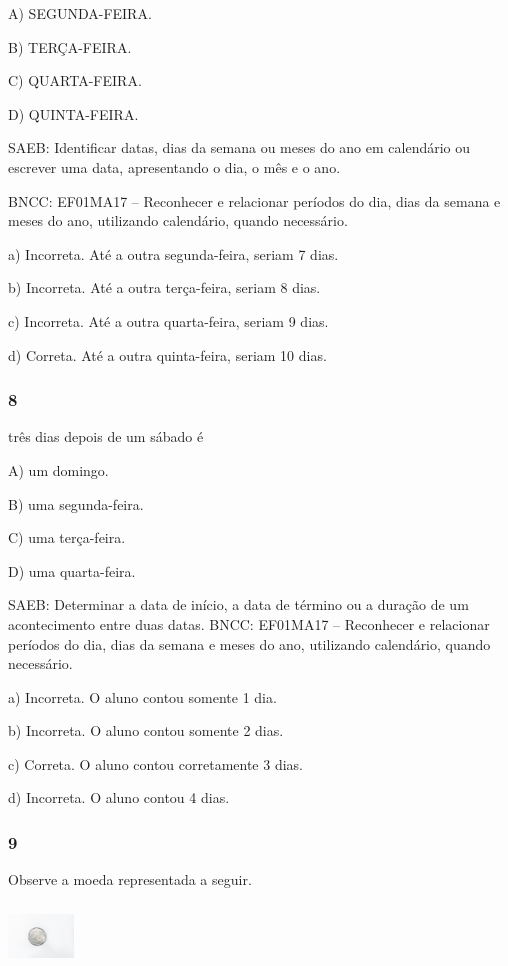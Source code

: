 \begin{itemize}
\begin{itemize}
A) SEGUNDA-FEIRA.

B) TERÇA-FEIRA.

C) QUARTA-FEIRA.

D) QUINTA-FEIRA.

SAEB: Identificar datas, dias da semana ou meses do ano em
calendário ou escrever uma data, apresentando o dia, o mês e o ano.

BNCC: EF01MA17 -- Reconhecer e relacionar períodos do dia, dias da semana
e meses do ano, utilizando calendário, quando necessário.

a) Incorreta. Até a outra segunda-feira, seriam 7 dias.

b) Incorreta. Até a outra terça-feira, seriam 8 dias.

c) Incorreta. Até a outra quarta-feira, seriam 9 dias.

d) Correta. Até a outra quinta-feira, seriam 10 dias.

\subsubsection{8}\label{section-124}

três dias depois de um sábado é

A) um domingo.

B) uma segunda-feira.

C) uma terça-feira.

D) uma quarta-feira.

SAEB: Determinar a data de início, a data de término ou a
duração de um acontecimento entre duas datas.
BNCC: EF01MA17 -- Reconhecer e relacionar períodos do dia, dias da semana
e meses do ano, utilizando calendário, quando necessário.

a) Incorreta. O aluno contou somente 1 dia.

b) Incorreta. O aluno contou somente 2 dias.

c) Correta. O aluno contou corretamente 3 dias.

d) Incorreta. O aluno contou 4 dias.

\subsubsection{9}\label{section-125}

Observe a moeda representada a seguir.

\includegraphics[width=0.69044in,height=0.66964in]{media/image64.jpg}


\end{itemize}
\end{itemize}

